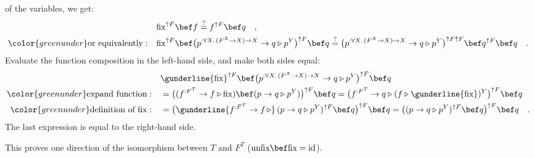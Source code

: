 of the variables, we get:
\begin{align*}
 & \text{fix}^{\uparrow F}\bef f\overset{?}{=}f^{\uparrow F}\bef q\quad,\\
{\color{greenunder}\text{or equivalently}:}\quad & \text{fix}^{\uparrow F}\bef\big(p^{:\forall X.\,(F^{X}\rightarrow X)\rightarrow X}\rightarrow q\triangleright p^{Y}\big)^{\uparrow F}\bef q\overset{?}{=}\big(p^{:\forall X.\,(F^{X}\rightarrow X)\rightarrow X}\rightarrow q\triangleright p^{Y}\big)^{\uparrow F\uparrow F}\bef q^{\uparrow F}\bef q\quad.
\end{align*}
Evaluate the function composition in the left-hand side, and make
both sides equal:
\begin{align*}
 & \gunderline{\text{fix}}^{\uparrow F}\bef\big(p^{:\forall X.\,(F^{X}\rightarrow X)\rightarrow X}\rightarrow q\triangleright p^{Y}\big)^{\uparrow F}\bef q\\
{\color{greenunder}\text{expand function}:}\quad & =\big((f^{:F^{T}}\rightarrow f\triangleright\text{fix})\bef(p\rightarrow q\triangleright p^{Y})\big)^{\uparrow F}\bef q=\big(f^{:F^{T}}\rightarrow q\triangleright(f\triangleright\gunderline{\text{fix}})^{Y}\big)^{\uparrow F}\bef q\\
{\color{greenunder}\text{definition of }\text{fix}:}\quad & =\big(\gunderline{f^{:F^{T}}\rightarrow f\,\triangleright}\,(p\rightarrow q\triangleright p^{Y})^{\uparrow F}\bef q\big)^{\uparrow F}\bef q=\big((p\rightarrow q\triangleright p^{Y})^{\uparrow F}\bef q\big)^{\uparrow F}\bef q\quad.
\end{align*}
The last expression is equal to the right-hand side.

This proves one direction of the isomorphism between $T$ and $F^{T}$
($\text{unfix}\bef\text{fix}=\text{id}$). 

